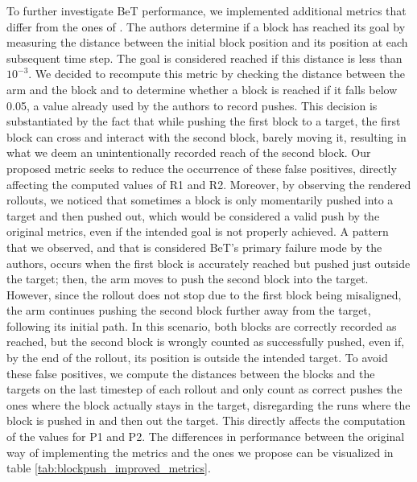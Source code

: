 To further investigate BeT performance, we implemented additional metrics that differ from the ones of \citet{shafiullah2022behavior}.
The authors determine if a block has reached its goal by measuring the distance between the initial block position and its position at each subsequent time step.
The goal is considered reached if this distance is less than $10^{-3}$. 
We decided to recompute this metric by checking the distance between the arm and the block and to determine whether a block is reached if it falls below 0.05, a value already used by the authors to record pushes. 
This decision is substantiated by the fact that while pushing the first block to a target, the first block can cross and interact with the second block, barely moving it, resulting in what we deem an unintentionally recorded reach of the second block. 
Our proposed metric seeks to reduce the occurrence of these false positives, directly affecting the computed values of R1 and R2.
Moreover, by observing the rendered rollouts, we noticed that sometimes a block is only momentarily pushed into a target and then pushed out, which would be considered a valid push by the original metrics, even if the intended goal is not properly achieved.
A pattern that we observed, and that is considered BeT's primary failure mode by the authors, occurs when the first block is accurately reached but pushed just outside the target; then, the arm moves to push the second block into the target. 
However, since the rollout does not stop due to the first block being misaligned, the arm continues pushing the second block further away from the target, following its initial path.
In this scenario, both blocks are correctly recorded as reached, but the second block is wrongly counted as successfully pushed, even if, by the end of the rollout, its position is outside the intended target. 
To avoid these false positives, we compute the distances between the blocks and the targets on the last timestep of each rollout and only count as correct pushes the ones where the block actually stays in the target, disregarding the runs where the block is pushed in and then out the target.
This directly affects the computation of the values for P1 and P2.
The differences in performance between the original way of implementing the metrics and the ones we propose can be visualized in table \ref{tab:blockpush_improved_metrics}.


